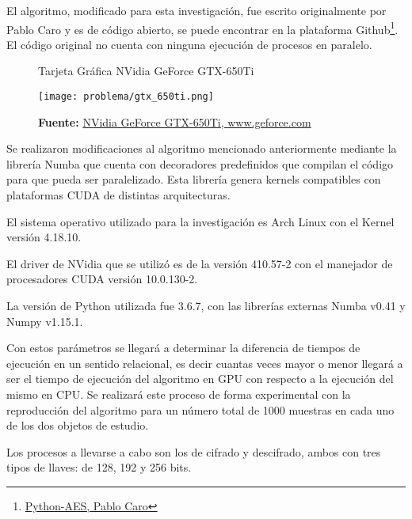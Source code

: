\documentclass[../main/main.tex]{subfiles}
\begin{document}
  El algoritmo, modificado para esta investigación, fue escrito originalmente por Pablo Caro y es de código abierto, se puede encontrar en la plataforma Github\footnote{\href{https://github.com/pcaro90/Python-AES}{Python-AES, Pablo Caro}}. El código original no cuenta con ninguna ejecución de procesos en paralelo.

  \begin{figure}
    \centering
    \caption{Tarjeta Gráfica NVidia GeForce GTX-650Ti}
    \texttt{[image: problema/gtx\_650ti.png]}
    \caption*{\textbf{Fuente:} \href{https://tinyurl.com/ycr3kouv}{NVidia GeForce GTX-650Ti, www.geforce.com}}
  \end{figure}

  Se realizaron modificaciones al algoritmo mencionado anteriormente mediante la librería Numba que cuenta con decoradores predefinidos que compilan el código para que pueda ser paralelizado. Esta librería genera kernels compatibles con plataformas CUDA de distintas arquitecturas.

  El sistema operativo utilizado para la investigación es Arch Linux con el Kernel versión 4.18.10.

  El driver de NVidia que se utilizó es de la versión 410.57-2 con el manejador de procesadores CUDA versión 10.0.130-2.

  La versión de Python utilizada fue 3.6.7, con las librerías externas Numba v0.41 y Numpy v1.15.1.

  Con estos parámetros se llegará a determinar la diferencia de tiempos de ejecución en un sentido relacional, es decir cuantas veces mayor o menor llegará a ser el tiempo de ejecución del algoritmo en GPU con respecto a la ejecución del mismo en CPU. Se realizará este proceso de forma experimental con la reproducción del algoritmo para un número total de 1000 muestras en cada uno de los dos objetos de estudio.

  Los procesos a llevarse a cabo son los de cifrado y descifrado, ambos con tres tipos de llaves: de 128, 192 y 256 bits.
\end{document}
